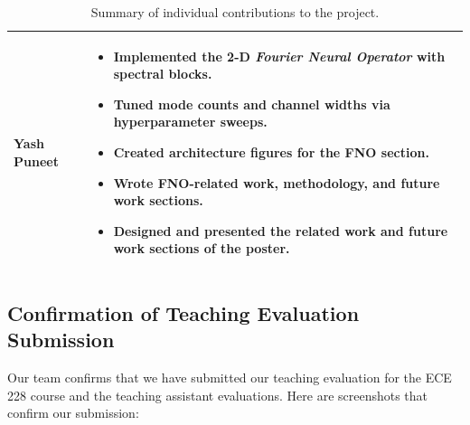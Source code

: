 \documentclass{article}
\begin{document}
\begin{table}[H]
\begin{tabular}{p{3.5cm} p{11cm}}
        \textbf{Yash Puneet} &
        \begin{itemize}
            \item Implemented the 2-D \emph{Fourier Neural Operator} with spectral blocks.
            \item Tuned mode counts and channel widths via hyperparameter sweeps.
            \item Created architecture figures for the FNO section.
            \item Wrote FNO-related work, methodology, and future work sections.
            \item Designed and presented the related work and future work sections of the poster.
        \end{itemize} \\

        \bottomrule
    \end{tabular}
    \caption{Summary of individual contributions to the project.}
    \label{tab:team_contrib}
\end{table}


\subsection*{Confirmation of Teaching Evaluation Submission}

Our team confirms that we have submitted our teaching evaluation for the ECE 228 course and the teaching assistant evaluations. Here are screenshots that confirm our submission:
\end{document}
